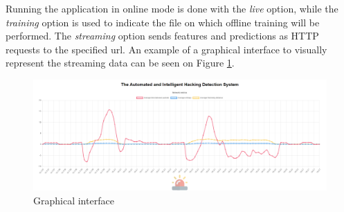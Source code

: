 Running the application in online mode is done with the \emph{live} option, while the \emph{training} option is used to indicate the file on which offline training will be performed. The \emph{streaming} option sends features and predictions as HTTP requests to the specified \gls{url}. An example of a graphical interface to visually represent the streaming data can be seen on Figure \ref{fig:website}.

\begin{figure}
    \centering
    \includegraphics[width = \linewidth]{img/parts/app/website.png}
    \caption{Graphical interface}
    \label{fig:website}
\end{figure}